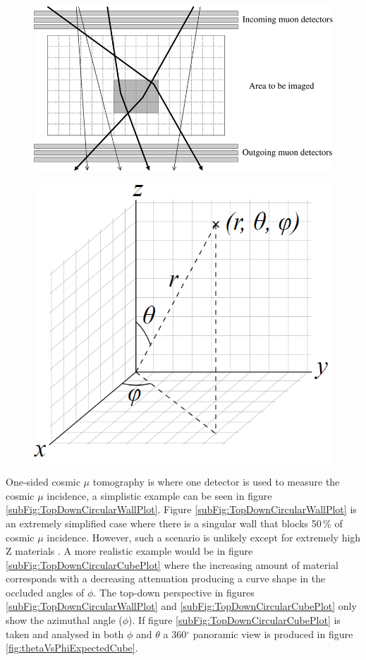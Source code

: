 \begin{figure}[!h]
 \centering
 \includegraphics[width=0.7\linewidth]{Chapter5/Figs/Raster/twoSidedCosmicMuon_schults2007.png}
 \label{fig:twoSidedCosmicMuonTomographySchults}
\end{figure}
 
 \begin{figure}[!h]
 \centering
 \includegraphics[width=0.3\linewidth]{Chapter5/Figs/wylfaRasterNew/sphericalPolarCoordinatesystem.png}
 \label{fig:sphericalPolarCoordinateSystem}
\end{figure}
 
 One-sided cosmic $\mu$ tomography is where one detector is used to measure the cosmic $\mu$ incidence, a simplistic example can be seen in figure \ref{subFig:TopDownCircularWallPlot}. Figure \ref{subFig:TopDownCircularWallPlot} is an extremely simplified case where there is a singular wall that blocks 50\,\% of cosmic $\mu$ incidence. However, such a scenario is unlikely except for extremely high Z materials \cite{schultz_2007}. A more realistic example would be in figure \ref{subFig:TopDownCircularCubePlot} where the increasing amount of material corresponds with a decreasing attenuation producing a curve shape in the occluded angles of $\phi$. The top-down perspective in figures \ref{subFig:TopDownCircularWallPlot} and \ref{subFig:TopDownCircularCubePlot} only show the azimuthal angle ($\phi$). If figure \ref{subFig:TopDownCircularCubePlot} is taken and analysed in both $\phi$ and $\theta$ a 360$^\circ$ panoramic view is produced in figure \ref{fig:thetaVsPhiExpectedCube}.
 
